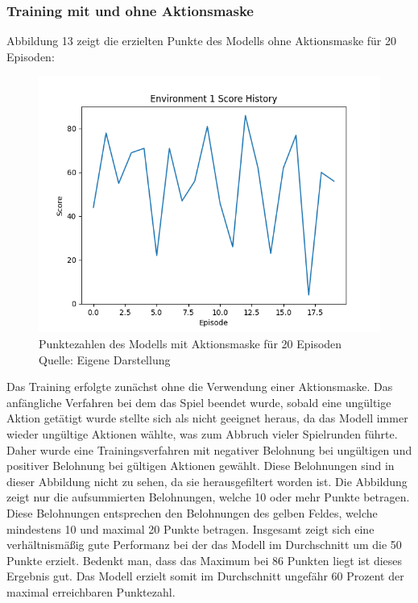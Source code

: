 \subsubsection{Training mit und ohne Aktionsmaske}
Abbildung 13 zeigt die erzielten Punkte des Modells ohne Aktionsmaske für 20 Episoden:
\nopagebreak
\begin{figure}[H]
	\includegraphics[width=1\textwidth]{Bilder/trainingwithoutcancalation} 
	\caption[Punktezahlen des Modells ohne Aktionsmaske für 20 Episoden]{Punktezahlen des Modells mit Aktionsmaske für 20 Episoden\\ Quelle: Eigene Darstellung}
\end{figure}

Das Training erfolgte zunächst ohne die Verwendung einer Aktionsmaske. Das anfängliche Verfahren bei dem das Spiel beendet wurde, sobald eine ungültige Aktion getätigt wurde stellte sich als nicht geeignet heraus, da das Modell immer wieder ungültige Aktionen wählte, was zum Abbruch vieler Spielrunden führte. Daher wurde eine Trainingsverfahren mit negativer Belohnung bei ungültigen und positiver Belohnung bei gültigen Aktionen gewählt. Diese Belohnungen sind in dieser Abbildung nicht zu sehen, da sie herausgefiltert worden ist. Die Abbildung zeigt nur die aufsummierten Belohnungen, welche 10 oder mehr Punkte betragen. Diese Belohnungen entsprechen den Belohnungen des gelben Feldes, welche mindestens 10 und maximal 20 Punkte betragen. Insgesamt zeigt sich eine verhältnismäßig gute Performanz bei der das Modell im Durchschnitt um die 50 Punkte erzielt. Bedenkt man, dass das Maximum bei 86 Punkten liegt ist dieses Ergebnis gut. Das Modell erzielt somit im Durchschnitt ungefähr 60 Prozent der maximal erreichbaren Punktezahl.\\

